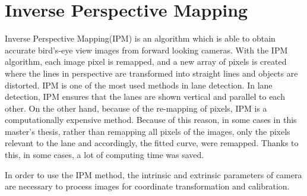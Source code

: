 %
\section{Inverse Perspective Mapping}\label{sec:Inverse Perspective Mapping}
%
Inverse Perspective Mapping(IPM) is an algorithm which is able to obtain accurate bird's-eye view images from forward looking cameras. With the IPM algorithm, each image pixel is remapped, and a new array of pixels is created where the lines in perspective are transformed into straight lines and objects are distorted. IPM is one of the most used methods in lane detection. In lane detection, IPM ensures that the lanes are shown vertical and parallel to each other. On the other hand, because of the re-mapping of pixels, IPM is a computationally expensive method. Because of this reason, in some cases in this master's thesis, rather than remapping all pixels of the images, only the pixels relevant to the lane and accordingly, the fitted curve, were remapped. Thanks to this, in some cases, a lot of computing time was saved.

In order to use the IPM method, the intrinsic and extrinsic parameters of camera are necessary to process images for coordinate transformation and calibration.

